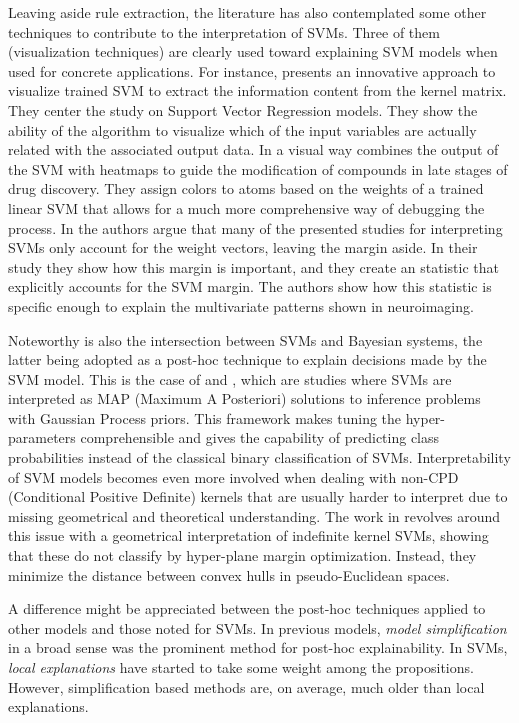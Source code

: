 \documentclass[final]{elsarticle}
\begin{document}
Leaving aside rule extraction, the literature has also contemplated some other techniques to contribute to the interpretation of SVMs. Three of them (visualization techniques) are clearly used toward explaining SVM models when used for concrete applications. For instance, \cite{ustun2007visualisation} presents an innovative approach to visualize trained SVM to extract the information content from the kernel matrix. They center the study on Support Vector Regression models. They show the ability of the algorithm to visualize which of the input variables are actually related with the associated output data. In \cite{interpretingHeatMapSVM} a visual way combines the output of the SVM with heatmaps to guide the modification of compounds in late stages of drug discovery. They assign colors to atoms based on the weights of a trained linear SVM that allows for a much more comprehensive way of debugging the process. In \cite{interpretingNeuroSVM} the authors argue that many of the presented studies for interpreting SVMs only account for the weight vectors, leaving the margin aside. In their study they show how this margin is important, and they create an statistic that explicitly accounts for the SVM margin. The authors show how this statistic is specific enough to explain the multivariate patterns shown in neuroimaging.

Noteworthy is also the intersection between SVMs and Bayesian systems, the latter being adopted as a post-hoc technique to explain decisions made by the SVM model. This is the case of \cite{probabilisticSVM} and \cite{bayesianForSVM}, which are studies where SVMs are interpreted as MAP (Maximum A Posteriori) solutions to inference problems with Gaussian Process priors. This framework makes tuning the hyper-parameters comprehensible and gives the capability of predicting class probabilities instead of the classical binary classification of SVMs. Interpretability of SVM models becomes even more involved when dealing with non-CPD (Conditional Positive Definite) kernels that are usually harder to interpret due to missing geometrical and theoretical understanding. The work in \cite{haasdonk2005feature} revolves around this issue with a geometrical interpretation of indefinite kernel SVMs, showing that these do not classify by hyper-plane margin optimization. Instead, they minimize the distance between convex hulls in pseudo-Euclidean spaces.

A difference might be appreciated between the post-hoc techniques applied to other models and those noted for SVMs. In previous models, \textit{model simplification} in a broad sense was the prominent method for post-hoc explainability. In SVMs, \textit{local explanations} have started to take some weight among the propositions. However, simplification based methods are, on average, much older than local explanations. 
\end{document}
